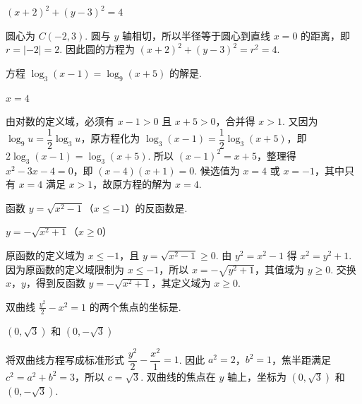 \begin{answer}
\((x + 2)^2 + (y - 3)^2 = 4\)
\end{answer}

\begin{solution}
圆心为 \(C(-2,3)\). 圆与 \(y\) 轴相切，所以半径等于圆心到直线 \(x=0\) 的距离，即 \(r=|-2|=2\). 因此圆的方程为
\((x+2)^2+(y-3)^2=r^2=4\).
\end{solution}

\begin{problem}
方程 \(\log_{3}(x-1)=\log_{9}(x+5) \) 的解是\fillinblank{}.
\end{problem}

\begin{answer}
\(x = 4\)
\end{answer}

\begin{solution}
由对数的定义域，必须有 \(x-1>0\) 且 \(x+5>0\)，合并得 \(x>1\). 又因为 \(\log_9u=\dfrac12\log_3u\)，原方程化为
\(\log_3(x-1)=\dfrac12\log_3(x+5)\)，即 \(2\log_3(x-1)=\log_3(x+5)\). 所以 \((x-1)^2=x+5\)，整理得 \(x^2-3x-4=0\)，即 \((x-4)(x+1)=0\). 候选值为 \(x=4\) 或 \(x=-1\)，其中只有 \(x=4\) 满足 \(x>1\)，故原方程的解为 \(x=4\).
\end{solution}

\begin{problem}
函数 \(y=\sqrt{x^{2}-1}\)（\(x\leqslant-1\)）的反函数是\fillinblank{}.
\end{problem}

\begin{answer}
\(y = -\sqrt{x^{2} + 1}\)（\(x \geqslant 0\)）
\end{answer}

\begin{solution}
原函数的定义域为 \(x\leqslant-1\)，且 \(y=\sqrt{x^2-1}\geqslant0\). 由 \(y^2=x^2-1\) 得 \(x^2=y^2+1\). 因为原函数的定义域限制为 \(x\leqslant-1\)，所以 \(x=-\sqrt{y^2+1}\)，其值域为 \(y\geqslant0\). 交换 \(x\)，\(y\)，得到反函数
\(y=-\sqrt{x^2+1}\)，其定义域为 \(x\geqslant0\).
\end{solution}

\begin{problem}
双曲线 \(\frac{y^{2}}{2}-x^{2}=1 \) 的两个焦点的坐标是\fillinblank{}.
\end{problem}

\begin{answer}
\((0,\sqrt{3})\) 和 \((0,-\sqrt{3})\)
\end{answer}

\begin{solution}
将双曲线方程写成标准形式
\(\dfrac{y^2}{2}-\dfrac{x^2}{1}=1\). 因此 \(a^2=2\)，\(b^2=1\)，焦半距满足 \(c^2=a^2+b^2=3\)，所以 \(c=\sqrt3\). 双曲线的焦点在 \(y\) 轴上，坐标为 \((0,\sqrt3)\) 和 \((0,-\sqrt3)\).
\end{solution}

